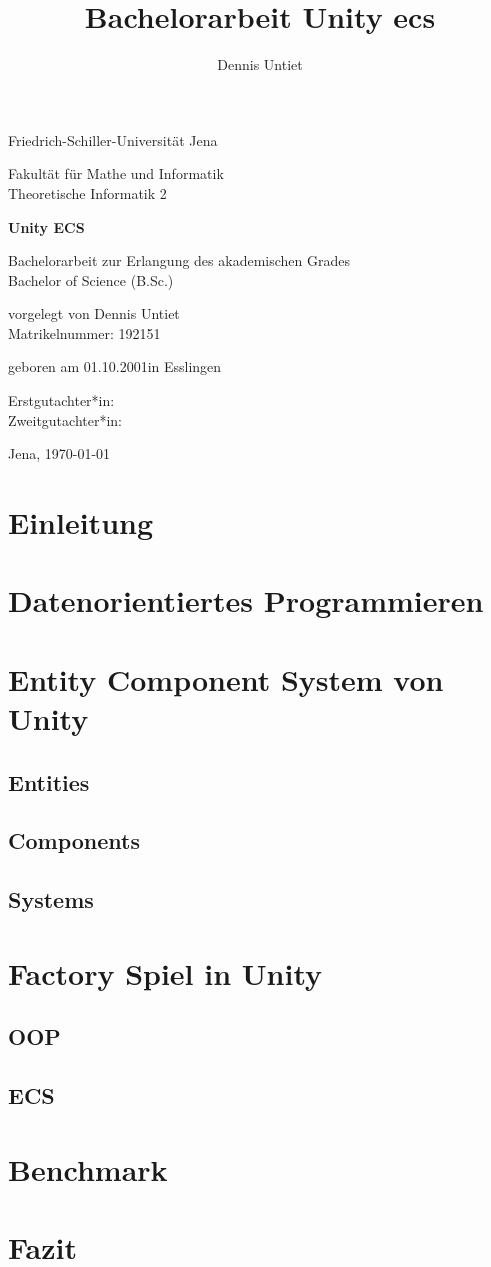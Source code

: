 \documentclass[12pt, titlepage]{article}
\title{Bachelorarbeit Unity ecs}
\author{Dennis Untiet}
\begin{document}
\begin{titlepage}
\centering
{\huge Friedrich-Schiller-Universität Jena \par}
{\large Fakultät für Mathe und Informatik\\Theoretische Informatik 2\par}
\vspace{1.5cm}
{\huge\bfseries Unity ECS\par}
\vspace{2cm}
{\Large Bachelorarbeit zur Erlangung des akademischen Grades\\Bachelor of Science (B.Sc.) \par}
\vspace{3cm}
{\large vorgelegt von Dennis Untiet\\Matrikelnummer: 192151\par}
\vspace{0.5cm}
{\large geboren am 01.10.2001\quad in Esslingen\par}
\vspace{2cm}
{\large Erstgutachter*in:\\Zweitgutachter*in:\par} 
\vfill
{\Large Jena, \today}
\end{titlepage}
\tableofcontents
\newpage
\section{Einleitung}
\newpage
\section{Datenorientiertes Programmieren}
\newpage
\section{Entity Component System von Unity}
\subsection{Entities}
\subsection{Components}
\subsection{Systems}
\newpage
\section{Factory Spiel in Unity}
\subsection{OOP}
\subsection{ECS}
\newpage
\section{Benchmark}
\newpage
\section{Fazit}
\end{document}
